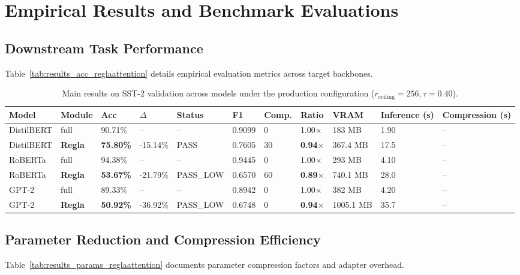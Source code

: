 \section{Empirical Results and Benchmark Evaluations}

\subsection{Downstream Task Performance}
Table~\ref{tab:results_acc_reglaattention} details empirical evaluation metrics across target backbones.

\begin{table}[t]
\centering
\small
\begin{tabular}{lllllllllll}
\toprule
\textbf{Model} & \textbf{Module} & \textbf{Acc} & \textbf{$\Delta$} & \textbf{Status} & \textbf{F1} & \textbf{Comp.} & \textbf{Ratio} & \textbf{VRAM} & \textbf{Inference (s)} & \textbf{Compression (s)} \\
\midrule
DistilBERT & full & 90.71\% & -- & -- & 0.9099 & 0 & 1.00$\times$ & 183 MB & 1.90 & -- \\
DistilBERT & \textbf{Regla} & \textbf{75.80\%} & -15.14\% & PASS & 0.7605 & 30 & \textbf{0.94$\times$} & 367.4 MB & 17.5 & -- \\
RoBERTa & full & 94.38\% & -- & -- & 0.9445 & 0 & 1.00$\times$ & 293 MB & 4.10 & -- \\
RoBERTa & \textbf{Regla} & \textbf{53.67\%} & -21.79\% & PASS_LOW & 0.6570 & 60 & \textbf{0.89$\times$} & 740.1 MB & 28.0 & -- \\
GPT-2 & full & 89.33\% & -- & -- & 0.8942 & 0 & 1.00$\times$ & 382 MB & 4.20 & -- \\
GPT-2 & \textbf{Regla} & \textbf{50.92\%} & -36.92\% & PASS_LOW & 0.6748 & 0 & \textbf{0.94$\times$} & 1005.1 MB & 35.7 & -- \\
\bottomrule
\end{tabular}
\caption{Main results on SST-2 validation across models under the production configuration ($r_{\mathrm{ceiling}}=256, \tau=0.40$).}
\label{tab:main_sst2}
\end{table}

\subsection{Parameter Reduction and Compression Efficiency}
Table~\ref{tab:results_params_reglaattention} documents parameter compression factors and adapter overhead.

